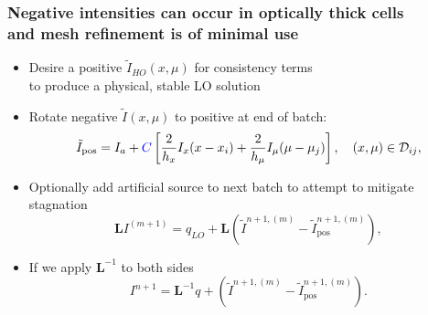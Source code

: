 \documentclass[xcolor=dvipsnames,hyperref={pdfpagelabels=false},unknownkeysallowed]{beamer}
\newcommand{\colb}[1]{{\color{blue} #1}}
\newcommand{\colG}[1]{{\color{Gray!110} #1}}
\newlength{\wideitemsep}
\let\olditem\item
\renewcommand{\item}{\setlength{\itemsep}{\wideitemsep}\olditem}
\newcommand{\B}[1]{\ensuremath{\mathbf{#1}}}
\begin{document}
\begin{frame}
    \frametitle{Negative intensities can occur in optically thick cells \\
    \colG{and mesh refinement is of minimal use}}

    {\addtolength\wideitemsep{5pt}
    \begin{itemize}
        \item  Desire a positive $\tilde I_{HO}(x,\mu)$ for consistency terms \\
            \colG{to produce a physical, stable LO solution}
        \item \colb{Rotate} negative $\tilde I(x,\mu)$ to positive at end of batch:
\begin{equation*}
    \tilde I_{\text{pos}} = I_{a} + \colb{C}\left[\frac{2}{h_x}I_x(x-x_i) +
    \frac{2}{h_\mu}I_\mu(\mu-\mu_j)\right],\quad     (x,\mu) \in \mathcal{D}_{ij},
\end{equation*}\pause
        \item Optionally add artificial source to next batch to attempt to mitigate stagnation
            \begin{equation*}
                \B L I^{(m+1)} = q_{LO} +  \mathbf{L}\left(\tilde{I}^{n+1,(m)} -
    \tilde{I}^{n+1,(m)}_{\text{pos}}\right),
            \end{equation*}
                \item If we apply $\B L^{-1}$ to both sides
\begin{equation}
    I^{n+1} = \B L^{-1} q + (\tilde{I}^{n+1,(m)} -
    \tilde{I}^{n+1,(m)}_{\text{pos}}).
\end{equation}
    \end{itemize}
}
\end{frame}
\end{document}
